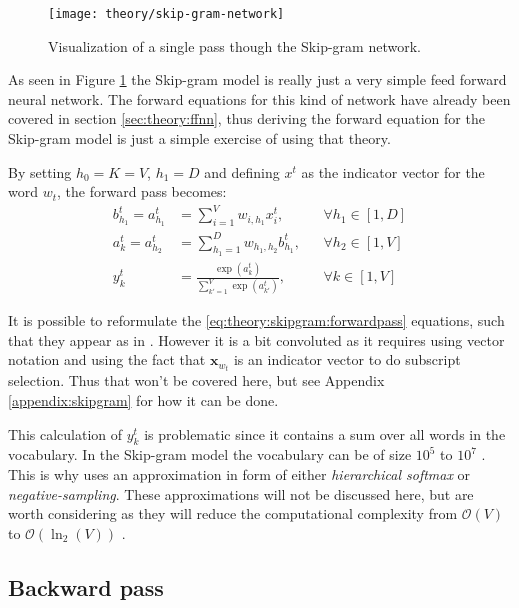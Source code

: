 \begin{figure}[H]
	\centering
	\texttt{[image: theory/skip-gram-network]}
	\caption{Visualization of a single pass though the Skip-gram network.}
	\label{fig:theory:skipgram:network}
\end{figure}

As seen in Figure \ref{fig:theory:skipgram:network} the Skip-gram model is really just a very simple feed forward neural network. The forward equations for this kind of network have already been covered in section \ref{sec:theory:ffnn}, thus deriving the forward equation for the Skip-gram model is just a simple exercise of using that theory. 

By setting $h_0 = K = V$, $h_1 = D$ and defining $x^t$ as the indicator vector for the word $w_t$, the forward pass becomes:
\begin{equation}
\begin{aligned}
b_{h_1}^t = a_{h_1}^t &= \sum_{i = 1}^V w_{i, h_1} x_i^t, && \forall h_1 \in [1, D] \\
a_{k}^t = a_{h_2}^t &= \sum_{h_1 = 1}^{D} w_{h_1, h_2} b_{h_1}^t, && \forall h_2 \in [1, V] \\
y_k^t &= \frac{\exp(a_k^t)}{\sum_{k'=1}^V \exp(a_{k'}^t)}, && \forall k \in [1, V]
\end{aligned}
\label{eq:theory:skipgram:forwardpass}
\end{equation}

It is possible to reformulate the \eqref{eq:theory:skipgram:forwardpass} equations, such that they appear as in \cite{word2vec-details}. However it is a bit convoluted as it requires using vector notation and using the fact that $\mathbf{x}_{w_t}$ is an indicator vector to do subscript selection. Thus that won't be covered here, but see Appendix \ref{appendix:skipgram} for how it can be done.

This calculation of $y_k^t$ is problematic since it contains a sum over all words in the vocabulary. In the Skip-gram model the vocabulary can be of size $10^5$ to $10^7$ \cite{word2vec-details}. This is why \cite{word2vec-comparing, word2vec-details, word2vec-explained} uses an approximation in form of either \textit{hierarchical softmax} or \textit{negative-sampling}. These approximations will not be discussed here, but are worth considering as they will reduce the computational complexity from $\mathcal{O}(V)$ to $\mathcal{O}(\ln_2(V))$ \cite{word2vec-comparing}.

\subsection{Backward pass}


